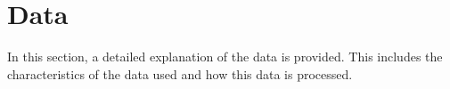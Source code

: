 \section{Data}
In this section, a detailed explanation of the data is provided. This includes the
characteristics of the data used and how this data is processed.



